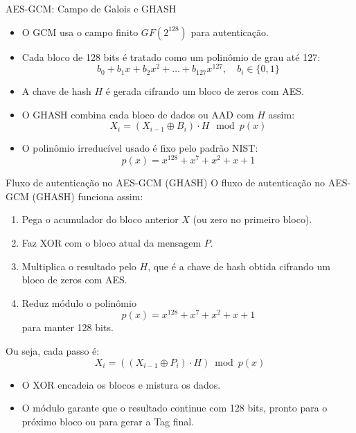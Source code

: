 \begin{frame}{AES-GCM: Campo de Galois e GHASH}
    \begin{itemize}
        \item O GCM usa o campo finito \(GF(2^{128})\) para autenticação.
        \item Cada bloco de 128 bits é tratado como um polinômio de grau até 127:
              \[
                  b_0 + b_1 x + b_2 x^2 + \dots + b_{127} x^{127}, \quad b_i \in \{0,1\}
              \]
        \item A chave de hash \(H\) é gerada cifrando um bloco de zeros com AES.
        \item O GHASH combina cada bloco de dados ou AAD com \(H\) assim:
              \[
                  X_i = (X_{i-1} \oplus B_i) \cdot H \mod p(x)
              \]
        \item O polinômio irreducível usado é fixo pelo padrão NIST:
              \[
                  p(x) = x^{128} + x^7 + x^2 + x + 1
              \]
    \end{itemize}
\end{frame}

\begin{frame}{Fluxo de autenticação no AES-GCM (GHASH)}
    O fluxo de autenticação no AES-GCM (GHASH) funciona assim:

    \begin{enumerate}
        \item Pega o acumulador do bloco anterior $X$ (ou zero no primeiro bloco).
        \item Faz XOR com o bloco atual da mensagem $P$.
        \item Multiplica o resultado pelo $H$, que é a chave de hash obtida cifrando um bloco de zeros com AES.
        \item Reduz módulo o polinômio
              \[
                  p(x) = x^{128} + x^7 + x^2 + x + 1
              \]
              para manter 128 bits.
    \end{enumerate}

    Ou seja, cada passo é:
    \[
        X_i = ((X_{i-1} \oplus P_i) \cdot H) \bmod p(x)
    \]

    \begin{itemize}
        \item O XOR encadeia os blocos e mistura os dados.
        \item O módulo garante que o resultado continue com 128 bits, pronto para o próximo bloco ou para gerar a Tag final.
    \end{itemize}
\end{frame}
